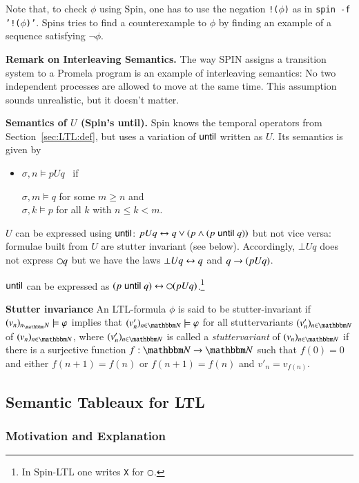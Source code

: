\smallskip\noindent Note that, to check $\phi$ using Spin, one has to
use the negation \texttt{!($\phi$)} as in \texttt{spin -f
  '!($\phi$)'}. Spins tries to find a counterexample to $\phi$ by
finding an example of a sequence satisfying $\neg\phi$.

\bigskip\noindent\textbf{Remark on Interleaving Semantics.} The way
SPIN assigns a transition system to a Promela program is an example of
interleaving semantics: No two independent processes are allowed to
move at the same time.  This assumption sounds
unrealistic, but it doesn't matter.

\bigskip\noindent\textbf{Semantics of $U$ (Spin's until). } Spin knows
the temporal operators from Section~\ref{sec:LTL:def}, but uses a
variation of $\mathrel{\mathsf{until}}$ written as $U$. Its semantics is given by
\begin{itemize}
\item $\sigma,n\models p U q$ \ if \ \
  \parbox{15em}{$\sigma,m\models q$ for some $m\ge n$ and\\
    $\sigma,k\models p$ for all $k$ with $n\le k < m$.}
\end{itemize}
$U$ can be expressed using $\mathrel{\mathsf{until}}$: $p U q \leftrightarrow q \vee (p \wedge (p
\mathrel{\mathsf{until}} q))$ but not vice versa: formulae built from $U$ are stutter
invariant (see below). Accordingly, $\bot U q$ does not express $\next q$ but we
have the laws $\bot U q \leftrightarrow q$ and $q\rightarrow(p U q)$.

\medskip\noindent $\mathrel{\mathsf{until}}$ can be expressed as $(p\until q) \biimp
\next(p U q)$.\footnote{In Spin-LTL one writes \texttt{X} for
  $\next$.}

\bigskip\noindent\textbf{Stutter invariance } An LTL-formula $\phi$ is
said to be stutter-invariant if $(v_n)_{n_\bbN}\models\phi$ implies
that $(v'_n)_{n\in\bbN}\models\phi$ for all stuttervariants
$(v'_n)_{n\in\bbN}$ of $(v_n)_{n\in\bbN}$, where $(v'_n)_{n\in\bbN}$ is
called a \emph{stuttervariant} of $(v_n)_{n\in\bbN}$ if there is a
surjective function $f:\bbN\to\bbN$ such that $f(0)=0$ and either
$f(n+1)=f(n)$ or $f(n+1)=f(n)$ and $v'_n=v_{f(n)}$.


\subsection{Semantic Tableaux for LTL}

\subsubsection*{Motivation and Explanation}

